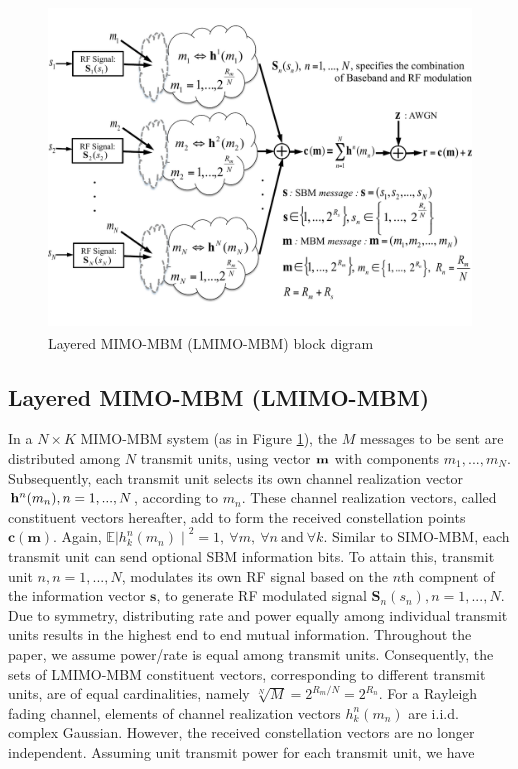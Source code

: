\begin{figure}[t]
\centering
\includegraphics[width = 12cm, height = 8.6cm]{./fig/MIMOSystemModel_v3-AK.pdf}
\caption{Layered MIMO-MBM (LMIMO-MBM) block digram}
\label{MIMO-MBM}
\end{figure}


\subsection{Layered MIMO-MBM (LMIMO-MBM)}

In a $ N\times K  $ MIMO-MBM system (as in Figure \ref{MIMO-MBM}), the ${M}$ messages to be sent are distributed among $ N $ transmit units, using vector $\mathbf{m}$ with components $m_1, ..., m_N$. Subsequently, each transmit unit selects its own channel realization vector $\mathbf{h}^n(m_n), n = 1, ..., N$,  according to $m_n$. These channel realization vectors, called constituent vectors hereafter, add to form the received constellation points $\mathbf{c}(\mathbf{m})$. Again, $\mathbb{E} {\mid {h}_k^n(m_n) \mid }^2 = 1, \ \forall{m}, \ \forall{n} \ \text{and} \ \forall{k} $. Similar to SIMO-MBM, each transmit unit can send optional SBM information bits. To attain this, transmit unit $n, n = 1, ..., N$, modulates its own RF signal based on the $n$th compnent of the information vector $\mathbf{s}$,  to generate RF modulated signal $\mathbf{S}_n(s_n), n = 1, ..., N$. Due to symmetry, distributing rate and power equally among individual transmit units results in the highest end to end mutual information. Throughout the paper, we assume power/rate is equal among transmit units. Consequently, the sets of LMIMO-MBM constituent vectors, corresponding to different transmit units, are of equal cardinalities, namely $ \sqrt[N]{M}=2^{R_m/N}=2^{R_n}$. For a Rayleigh fading channel, elements  of channel realization vectors $ {h}_k^n(m_n)$ are i.i.d. complex Gaussian. However, the received constellation vectors are no longer independent. Assuming unit transmit power for each transmit unit, we have

